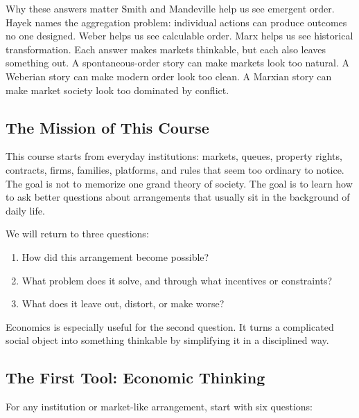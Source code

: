 \documentclass[10pt,a4paper]{article}
\begin{document}
\begin{insightbox}{Why these answers matter}
Smith and Mandeville help us see emergent order. Hayek names the aggregation problem: individual actions can produce outcomes no one designed. Weber helps us see calculable order. Marx helps us see historical transformation. Each answer makes markets thinkable, but each also leaves something out. A spontaneous-order story can make markets look too natural. A Weberian story can make modern order look too clean. A Marxian story can make market society look too dominated by conflict.
\end{insightbox}

\subsection{The Mission of This Course}

This course starts from everyday institutions: markets, queues, property rights, contracts, firms, families, platforms, and rules that seem too ordinary to notice. The goal is not to memorize one grand theory of society. The goal is to learn how to ask better questions about arrangements that usually sit in the background of daily life.

We will return to three questions:

\begin{enumerate}
  \item How did this arrangement become possible?
  \item What problem does it solve, and through what incentives or constraints?
  \item What does it leave out, distort, or make worse?
\end{enumerate}

Economics is especially useful for the second question. It turns a complicated social object into something thinkable by simplifying it in a disciplined way.

\subsection{The First Tool: Economic Thinking}

For any institution or market-like arrangement, start with six questions:
\end{document}
